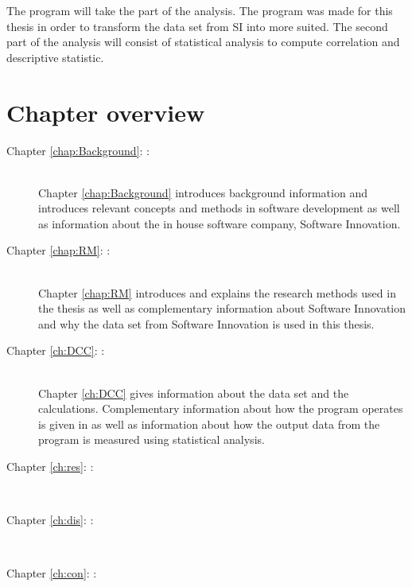 \documentclass[UKenglish]{ifimaster}  %
\begin{document}
The program will take the part of the analysis. The program was made for this thesis in order to transform the data set from SI into more suited. The second part of the analysis will consist of statistical analysis to compute correlation and descriptive statistic.
 

\section{Chapter overview}
\begin{description}
\item[Chapter \ref{chap:Background}: :] \hfill \\  
Chapter \ref{chap:Background} introduces background information and introduces relevant concepts and methods in software development as well as information about the in house software company, Software Innovation. 
\item[Chapter \ref{chap:RM}: :] \hfill \\  
Chapter \ref{chap:RM} introduces and explains the research methods used in the thesis as well as complementary information about Software Innovation and why the data set from Software Innovation is used in this thesis.  
\item[Chapter \ref{ch:DCC}: :] \hfill \\
Chapter \ref{ch:DCC} gives information about the data set and the calculations. Complementary information about how the program operates is given in as well as information about how the output data from the program is measured using statistical analysis. 

\item[Chapter \ref{ch:res}: :] \hfill \\
\item[Chapter \ref{ch:dis}: :] \hfill \\
\item[Chapter \ref{ch:con}: :] \hfill \\
\end{description}




\end{document}
